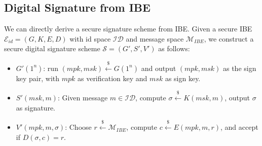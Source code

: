 \subsection{Digital Signature from IBE}
We can directly derive a secure signature scheme from IBE. 
Given a secure IBE $\mathcal{E}_{id}=(G,K,E,D)$ with id space $\mathcal{ID}$ and message space $\mathcal{M}_{IBE}$, we construct a secure digital signature scheme $\mathcal{S} = (G',S',V')$ as follows: 
\begin{itemize}
    \item $G'(1^n)$: run $(mpk, msk)\stackrel{\$}{\gets} G(1^n)$ and output $(mpk, msk)$ as the sign key pair, with $mpk$ as verification key and $msk$ as sign key.
    \item $S'(msk,m)$: Given message $m\in\mathcal{ID}$, compute $\sigma\stackrel{\$}{\gets}K(msk,m)$, output $\sigma$ as signature. 
    \item $V'(mpk,m,\sigma)$: Choose $r\stackrel{\$}{\gets}\mathcal{M}_{IBE}$, compute $c\stackrel{\$}{\gets}E(mpk,m,r)$, and accept if $D(\sigma,c) = r$. 
\end{itemize}

